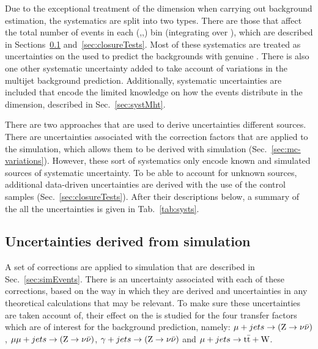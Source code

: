 Due to the exceptional treatment of the \MHT dimension when carrying
out background estimation, the systematics are split into two types.
There are those that affect the total number of events in each
(\HT,\nj,\nb) bin (integrating over \MHT), which are described in
Sections~\ref{sec:simUnc} and~\ref{sec:closureTests}. Most of these
systematics are treated as uncertainties on the \TFs used to predict
the \SM backgrounds with genuine \MET. There is also one other
systematic uncertainty added to take account of variations in the \QCD
multijet background prediction. Additionally, systematic uncertainties
are included that encode the limited knowledge on how the events
distribute in the \mht dimension, described in Sec.~\ref{sec:systMht}.

There are two approaches that are used to derive uncertainties
different sources. There are uncertainties associated with the
correction factors that are applied to the simulation, which allows
them to be derived with simulation (Sec.~\ref{sec:mc-variations}).
However, these sort of systematics only encode known and simulated
sources of systematic uncertainty. To be able to account for unknown
sources, additional data-driven uncertainties are derived  with the
use of the control samples (Sec.~\ref{sec:closureTests}). After their
descriptions below, a summary of the all the uncertainties is given in
Tab.~\ref{tab:systs}.

\subsection{Uncertainties derived from simulation}
\label{sec:simUnc}

A set of corrections are applied to simulation that are described in
Sec.~\ref{sec:simEvents}. There is an uncertainty associated with each
of these corrections, based on the way in which they are derived and
uncertainties in any theoretical calculations that may be relevant. To
make sure these uncertainties are taken account of, their effect on
the \TFs is studied for the four transfer factors which are of interest 
for the background prediction, namely: $\mu + jets \rightarrow ({\text Z} \rightarrow \nu\bar{\nu})$,
$\mu\mu + jets \rightarrow ({\text Z} \rightarrow \nu\bar{\nu})$, $\gamma + jets \rightarrow ({\text Z} \rightarrow \nu\bar{\nu})$ and $\mu + jets
\rightarrow \mathrm{t\bar{t}+W}$. 


